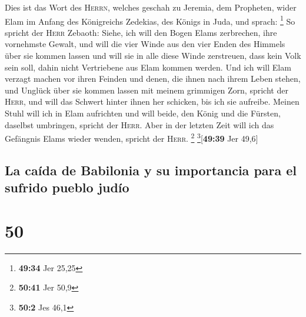  Dies ist das Wort des \textsc{Herrn}, welches geschah zu
Jeremia, dem Propheten, wider Elam im Anfang des Königreichs Zedekias,
des Königs in Juda, und sprach: \footnote{\textbf{49:34} Jer 25,25}
 So spricht der \textsc{Herr} Zebaoth: Siehe, ich will
den Bogen Elams zerbrechen, ihre vornehmste Gewalt,  und
will die vier Winde aus den vier Enden des Himmels über sie kommen
lassen und will sie in alle diese Winde zerstreuen, dass kein Volk sein
soll, dahin nicht Vertriebene aus Elam kommen werden. 
Und ich will Elam verzagt machen vor ihren Feinden und denen, die ihnen
nach ihrem Leben stehen, und Unglück über sie kommen lassen mit meinem
grimmigen Zorn, spricht der \textsc{Herr}, und will das Schwert hinter
ihnen her schicken, bis ich sie aufreibe.  Meinen Stuhl
will ich in Elam aufrichten und will beide, den König und die Fürsten,
daselbst umbringen, spricht der \textsc{Herr}.  Aber in
der letzten Zeit will ich das Gefängnis Elams wieder wenden, spricht der
\textsc{Herr}. \footnote{\textbf{50:41} Jer 50,9}
\footnote{\textbf{50:2} Jes 46,1}{[}\textbf{49:39} Jer 49,6{]}

\hypertarget{la-cauxedda-de-babilonia-y-su-importancia-para-el-sufrido-pueblo-juduxedo}{%
\subsection{La caída de Babilonia y su importancia para el sufrido
pueblo
judío}\label{la-cauxedda-de-babilonia-y-su-importancia-para-el-sufrido-pueblo-juduxedo}}

\hypertarget{section-49}{%
\section{50}\label{section-49}}

